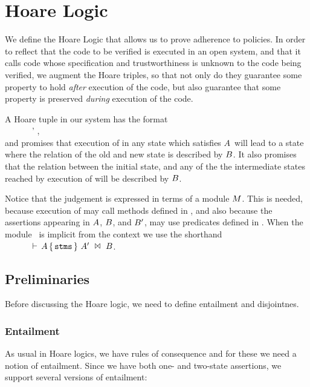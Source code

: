 \HoareFigOne

\section{Hoare Logic}

We define the Hoare Logic that allows us to prove adherence to
policies. In order to reflect that the code to be verified is executed
in an open system, and that it calls code whose specification and
trustworthiness is unknown to the code being verified, we augment the
Hoare triples, so that not only do they guarantee some property to
hold {\em after} execution of the code, but also guarantee that some
property is preserved {\em during} execution of the
code.



A Hoare tuple in our system has   the format\\
$ ~ \ \ \ \ \ \ \ \  \ \ \ \  $   \HoareExpl    {\A} {} {\M} {\B'} {\B},\\
and  promises that execution of  in any
state which satisfies $A$~will lead to a state where the relation of the old and new state is described by $B$.
It also promises that
the relation between the initial state, and any of the
the intermediate states reached by execution of   will be described by $B$.

Notice that the judgement is expressed in terms of a module $M$.
This is needed, because  execution of   may call methods defined in \M, and also
because  the assertions appearing in $A$, $B$, and $B'$, may use  predicates
 defined in \M.   When the module \M\ is implicit from the context
 we use the shorthand\\
$ ~ \ \ \ \ \ \ \ \  \ \ \ \  $ ${\vdash \,{A}\, \{\, {{\textrm{\ttfamily{stms}}}}\, \}\ {A'}\ \Join\ {B} }$.

\subsection{Preliminaries}
Before discussing the Hoare logic, we need to define entailment and disjointnes.

\subsubsection{Entailment}

As usual in Hoare logics, we have rules of consequence and for these we need a notion of entailment.
Since we have both one- and two-state assertions, we support several versions of entailment:

